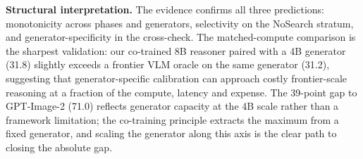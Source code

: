 \documentclass{article}
\newcommand{\CondGS}{\textsc{Blind Search}}
\newcommand{\CondGAS}{\textsc{Generator-Adaptive Search}}
\begin{document}
\textbf{Structural interpretation.}
The evidence confirms all three predictions: monotonicity across phases and generators, selectivity on the NoSearch stratum, and generator-specificity in the cross-check.
The matched-compute comparison is the sharpest validation: our co-trained 8B reasoner paired with a 4B generator (31.8) slightly exceeds a frontier VLM oracle on the same generator (31.2), suggesting that generator-specific calibration can approach costly frontier-scale reasoning at a fraction of the compute, latency and expense.
The 39-point gap to GPT-Image-2 (71.0) reflects generator capacity at the 4B scale rather than a framework limitation; the co-training principle extracts the maximum from a fixed generator, and scaling the generator along this axis is the clear path to closing the absolute gap.





\end{document}
